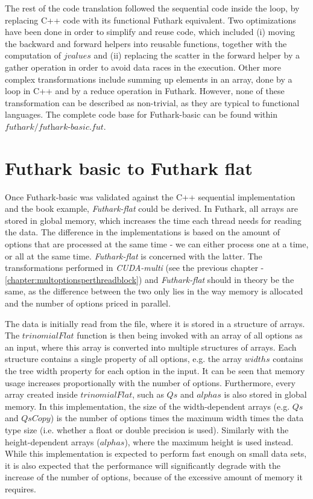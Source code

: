 The rest of the code translation followed the sequential code inside the loop, by replacing C++ code with its functional Futhark equivalent. Two optimizations have been done in order to simplify and reuse code, which included (i) moving the backward and forward helpers into reusable functions, together with the computation of $\mathit{jvalues}$ and (ii) replacing the scatter in the forward helper by a gather operation in order to avoid data races in the execution. Other more complex transformations include summing up elements in an array, done by a loop in C++ and by a reduce operation in Futhark. However, none of these transformation can be described as non-trivial, as they are typical to functional languages. The complete code base for Futhark-basic can be found within $\textit{futhark/futhark-basic.fut}$.

\section{Futhark basic to Futhark flat}
Once Futhark-basic was validated against the C++ sequential implementation and the book example, \textit{Futhark-flat} could be derived. In Futhark, all arrays are stored in global memory, which increases the time each thread needs for reading the data. The difference in the implementations is based on the amount of options that are processed at the same time - we can either process one at a time, or all at the same time. \textit{Futhark-flat} is concerned with the latter. The transformations performed in \textit{CUDA-multi} (see the previous chapter - \ref{chapter:multoptionsperthreadblock}) and \textit{Futhark-flat} should in theory be the same, as the difference between the two only lies in the way memory is allocated and the number of options priced in parallel.

The data is initially read from the file, where it is stored in a structure of arrays. The $\mathit{trinomialFlat}$ function is then being invoked with an array of all options as an input, where this array is converted into multiple structures of arrays. Each structure contains a single property of all options, e.g. the array $\mathit{widths}$ contains the tree width property for each option in the input. It can be seen that memory usage increases proportionally with the number of options. Furthermore, every array created inside $\mathit{trinomialFlat}$, such as $\mathit{Qs}$ and $\mathit{alphas}$ is also stored in global memory. In this implementation, the size of the width-dependent arrays (e.g. $\mathit{Qs}$ and $\mathit{QsCopy}$) is the number of options times the maximum width times the data type size (i.e. whether a float or double precision is used). Similarly with the height-dependent arrays ($\mathit{alphas}$), where the maximum height is used instead. While this implementation is expected to perform fast enough on small data sets, it is also expected that the performance will significantly degrade with the increase of the number of options, because of the excessive amount of memory it requires. 

